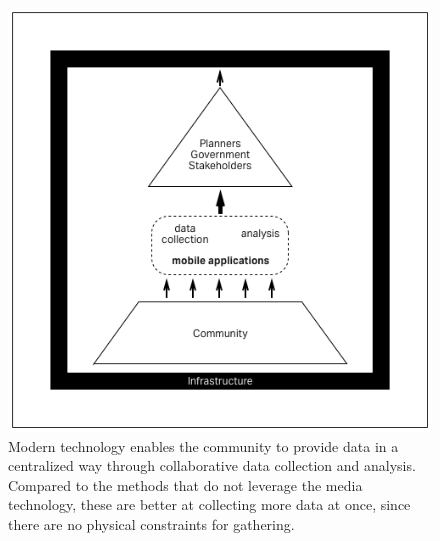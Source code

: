 \begin{figure}[!htb]
    \includegraphics[width=\textwidth]{chapters/2/fig/unstructured_app.png}               
    \caption[diagram: unstructured app]{
        Modern technology enables the community to provide data in a centralized way through
        collaborative data collection and analysis.
        Compared to the methods that do not leverage the media technology,
        these are better at collecting more data at once,
        since there are no physical constraints for gathering.
        }
  \label{fig:unstructured_app}
\end{figure}


